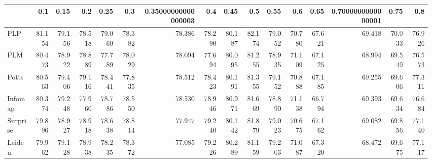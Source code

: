 \begin{tabular}{lrrrrrrrrrrrrrrr}
\toprule
{} &    0.1 &   0.15 &    0.2 &   0.25 &    0.3 & 0.35000000000000003 &    0.4 &   0.45 &    0.5 &   0.55 &    0.6 &   0.65 & 0.7000000000000001 &   0.75 &    0.8 \\
\midrule
PLP      & 81.154 & 79.156 & 78.518 & 79.060 & 78.382 &              78.386 & 78.290 & 80.187 & 82.174 & 79.052 & 70.780 & 67.621 &             69.418 & 70.033 & 76.926 \\
PLM      & 80.473 & 78.922 & 78.889 & 77.789 & 78.029 &              78.094 & 77.694 & 80.095 & 81.255 & 78.935 & 71.109 & 67.125 &             68.994 & 69.549 & 76.573 \\
Potts    & 80.563 & 79.406 & 79.116 & 78.441 & 77.835 &              78.512 & 78.423 & 80.191 & 81.355 & 79.152 & 70.888 & 67.185 &             69.255 & 69.606 & 77.311 \\
Infomap  & 80.374 & 79.248 & 77.960 & 78.786 & 78.550 &              78.530 & 78.946 & 80.971 & 81.669 & 78.890 & 71.138 & 66.794 &             69.393 & 69.634 & 76.684 \\
Surprise & 79.896 & 78.927 & 78.918 & 78.638 & 78.814 &              77.947 & 79.240 & 80.142 & 81.879 & 79.023 & 70.675 & 67.162 &             69.082 & 69.856 & 77.140 \\
Leiden   & 79.962 & 79.128 & 78.938 & 78.235 & 78.372 &              77.085 & 79.226 & 80.289 & 81.159 & 79.203 & 71.087 & 67.320 &             68.472 & 69.675 & 77.117 \\
\bottomrule
\end{tabular}
